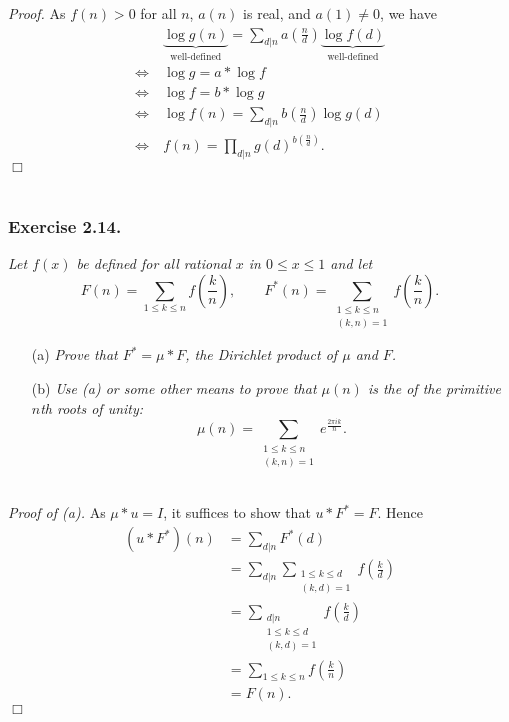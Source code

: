 \documentclass{article}
\begin{document}
\emph{Proof.}
  As $f(n) > 0$ for all $n$, $a(n)$ is real, and $a(1) \neq 0$,
  we have
  \begin{align*}
    & \:
    \underbrace{\log g(n)}_{\text{well-defined}}
    = \sum_{d|n} a\left(\frac{n}{d}\right) \underbrace{\log f(d)}_{\text{well-defined}} \\
    \Longleftrightarrow & \:
    \log g = a * \log f \\
    \Longleftrightarrow & \:
    \log f = b * \log g \\
    \Longleftrightarrow & \:
    \log f(n)
    = \sum_{d|n} b\left(\frac{n}{d}\right) \log g(d) \\
    \Longleftrightarrow & \:
    f(n) = \prod_{d|n} g(d)^{b\left(\frac{n}{d}\right)}.
  \end{align*}
$\Box$ \\\\






\subsubsection*{Exercise 2.14.}
\emph{Let $f(x)$ be defined for all rational $x$ in $0 \leq x \leq 1$ and let
\[
  F(n) = \sum_{1 \leq k \leq n} f\left( \frac{k}{n} \right),
  \qquad
  F^{*}(n) = \sum_{\substack{1 \leq k \leq n \\ (k,n)=1}} f\left( \frac{k}{n} \right).  
\]}
\begin{enumerate}
\item[(a)]
  \emph{Prove that $F^{*} = \mu * F$, the Dirichlet product of $\mu$ and $F$.}

\item[(b)]
  \emph{Use (a) or some other means to prove that $\mu(n)$ is the of the primitive $n$th
  roots of unity:}
  \[
    \mu(n) = \sum_{\substack{1 \leq k \leq n \\ (k,n)=1}} e^{\frac{2\pi i k}{n}}.
  \] \\
\end{enumerate}



\emph{Proof of (a).}
  As $\mu * u = I$, it suffices to show that $u * F^{*} = F$.
  Hence
  \begin{align*}
    (u * F^{*})(n)
    &= \sum_{d|n} F^{*}(d) \\
    &= \sum_{d|n} \sum_{\substack{1 \leq k \leq d \\ (k,d)=1}} f\left( \frac{k}{d} \right) \\
    &= \sum_{\substack{d|n \\ 1 \leq k \leq d \\ (k,d)=1}} f\left( \frac{k}{d} \right) \\
    &= \sum_{1 \leq k \leq n} f\left( \frac{k}{n} \right) \\
    &= F(n).
  \end{align*}
$\Box$ \\
\end{document}
